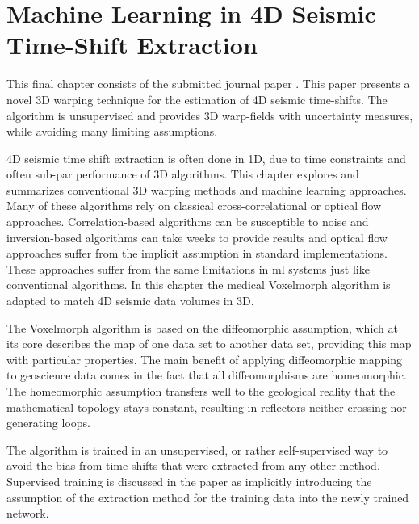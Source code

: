 \section{Machine Learning in 4D Seismic Time-Shift Extraction}

This final chapter consists of the submitted journal paper  \citep{dramsch20193dwarping}. This paper presents a novel 3D warping technique for the estimation of 4D seismic time-shifts. The algorithm is unsupervised and provides 3D warp-fields with uncertainty measures, while avoiding many limiting assumptions.

4D seismic time shift extraction is often done in 1D, due to time constraints and often sub-par performance of 3D algorithms. This chapter explores and summarizes conventional 3D warping methods and machine learning approaches. Many of these algorithms rely on classical cross-correlational or optical flow approaches. Correlation-based algorithms can be susceptible to noise and inversion-based algorithms can take weeks to provide results and optical flow approaches suffer from the implicit assumption in standard implementations. These approaches suffer from the same limitations in \acl{ml} systems just like conventional algorithms. In this chapter the medical Voxelmorph algorithm is adapted to match 4D seismic data volumes in 3D.

The Voxelmorph algorithm is based on the diffeomorphic assumption, which at its core describes the map of one data set to another data set, providing this map with particular properties. The main benefit of applying diffeomorphic mapping to geoscience data comes in the fact that all diffeomorphisms are homeomorphic. The homeomorphic assumption transfers well to the geological reality that the mathematical topology stays constant, resulting in reflectors neither crossing nor generating loops. 

The algorithm is trained in an unsupervised, or rather self-supervised way to avoid the bias from time shifts that were extracted from any other method. Supervised training is discussed in the paper as implicitly introducing the assumption of the extraction method for the training data into the newly trained network.

